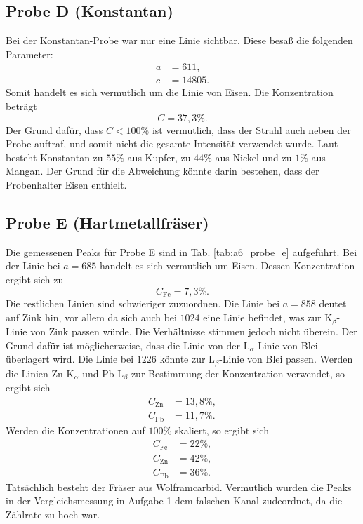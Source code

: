 
\subsection{Probe D (Konstantan)}

Bei der Konstantan-Probe war nur eine Linie sichtbar. Diese besaß die folgenden Parameter:
\begin{align}
 a &= 611, \\
 c &= 14805. 
\end{align}
Somit handelt es sich vermutlich um die Linie von Eisen. Die Konzentration beträgt
\begin{equation}
 C = 37,3\%. 
\end{equation}
Der Grund dafür, dass $C<100\%$ ist vermutlich, dass der Strahl auch neben der Probe auftraf, und somit nicht die gesamte Intensität verwendet wurde. Laut \cite{wiki_konst} besteht Konstantan zu $55\%$ aus Kupfer, zu $44\%$ aus Nickel und zu $1\%$ aus Mangan.
Der Grund für die Abweichung könnte darin bestehen, dass der Probenhalter Eisen enthielt.

\subsection{Probe E (Hartmetallfräser)}

Die gemessenen Peaks für Probe E sind in Tab. \ref{tab:a6_probe_e} aufgeführt. Bei der Linie bei $a=685$ handelt es sich vermutlich um Eisen. Dessen Konzentration ergibt sich zu
\begin{equation}
 C_{\textrm{Fe}} = 7,3\%.
\end{equation}
Die restlichen Linien sind schwieriger zuzuordnen. Die Linie bei $a=858$ deutet auf Zink hin, vor allem da sich auch bei $1024$ eine Linie befindet, was zur K$_{\beta}$-Linie von Zink passen würde. Die Verhältnisse stimmen jedoch nicht überein. 
Der Grund dafür ist möglicherweise, dass die Linie von der L$_{\alpha}$-Linie von Blei überlagert wird. Die Linie bei $1226$ könnte zur L$_{\beta}$-Linie von Blei passen. Werden die Linien Zn K$_{\alpha}$ und Pb L$_{\beta}$ zur Bestimmung der Konzentration verwendet, so ergibt sich
\begin{align}
 C_{\textrm{Zn}} &= 13,8\%, \\
 C_{\textrm{Pb}} &= 11,7\%.
\end{align}
Werden die Konzentrationen auf $100\%$ skaliert, so ergibt sich
\begin{align}
 C_{\textrm{Fe}} &= 22\%, \\
 C_{\textrm{Zn}} &= 42\%, \\
 C_{\textrm{Pb}} &= 36\%.
\end{align}
Tatsächlich besteht der Fräser aus Wolframcarbid. Vermutlich wurden die Peaks in der Vergleichsmessung in Aufgabe 1 dem falschen Kanal zudeordnet, da die Zählrate zu hoch war. 

